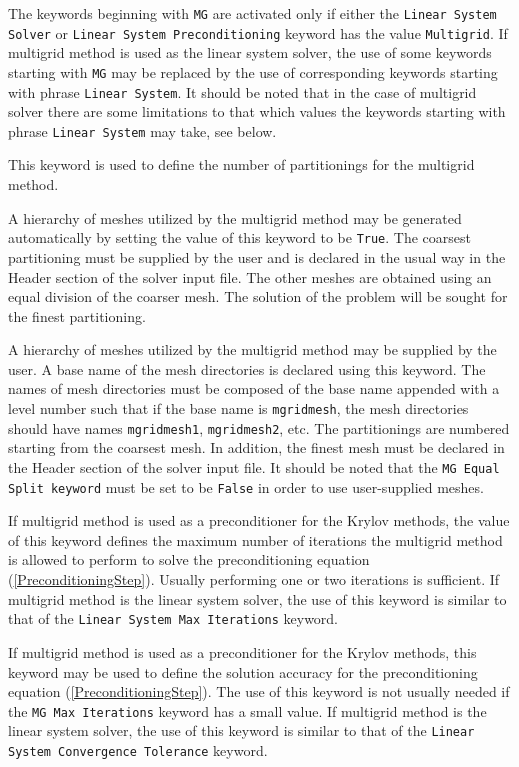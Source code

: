 \sifend


The keywords beginning with {\tt MG} are activated only if either 
the {\tt Linear System Solver} or {\tt Linear System Preconditioning} keyword has 
the value {\tt Multigrid}. If multigrid method is used as the linear system solver,
the use of some keywords starting with {\tt MG} may be replaced by the use of 
corresponding keywords starting with phrase {\tt Linear System}.
It should be noted that in the case of multigrid solver there are some limitations to
that which values the keywords starting with phrase {\tt Linear System} may take,
see below.


\sifbegin
{}
This keyword is used to define the number of partitionings for the multigrid method.

A hierarchy of meshes utilized by the multigrid method may be generated automatically 
by setting the value of this keyword to be {\tt True}. The coarsest partitioning must 
be supplied by the user and is declared in the usual way in the Header section of
the solver input file. The other meshes are obtained using an equal division of 
the coarser mesh. The solution of the problem will be sought for the finest partitioning.

A hierarchy of meshes utilized by the multigrid method may be supplied by the user.
A base name of the mesh directories is declared using this keyword.
The names of mesh directories must be composed of the base name appended with a level number
such that if the base name is {\tt mgridmesh}, the mesh directories should have names 
{\tt mgridmesh1}, {\tt mgridmesh2}, etc. The partitionings are numbered starting from 
the coarsest mesh. In addition, the finest mesh must be 
declared in the Header section of the solver input file. It should be noted that
the {\tt MG Equal Split keyword} must be set to be {\tt False} in order to use 
user-supplied meshes. 

If multigrid method is used as a preconditioner for the Krylov methods, the value of 
this keyword defines the maximum number of iterations the multigrid method is 
allowed to perform to solve the preconditioning equation (\ref{PreconditioningStep}). 
Usually performing one or two iterations is sufficient.
If multigrid method is the linear system solver, the use of this keyword is 
similar to that of the {\tt Linear System Max Iterations} keyword.

If multigrid method is used as a preconditioner for the Krylov methods, 
this keyword may be used to define the solution accuracy for the
preconditioning equation (\ref{PreconditioningStep}). 
The use of this keyword is not usually needed if the {\tt MG Max Iterations} 
keyword has a small value. If multigrid method is the linear system solver, 
the use of this keyword is similar to that of 
the {\tt Linear System Convergence Tolerance} keyword.

